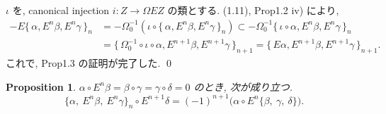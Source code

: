\documentclass[12pt, leqno]{ltjsarticle}
\newcommand{\Ex}{E}        %
\newcommand{\todai}[2][]{\{\,#2\,\}_{#1}}      %
\numberwithin{equation}{section}
\theoremstyle{plain}
\newtheorem{proposition}[theorem]{Proposition}
\theoremstyle{definition}
\theoremstyle{remark}
\begin{document}
\(\iota\) を, canonical injection \(i:Z\to \Omega EZ\)
の類とする.
(1.11), Prop1.2 iv) により,
\[
\begin{align*}
  -E\todai[n]{\alpha, E^n\beta, E^n\gamma}
  & = -\Omega_0^{-1}(\iota \circ \todai[n]{\alpha, E^n\beta, E^n\gamma})
  \subset -\Omega_0^{-1}\todai[n]{\iota\circ\alpha, E^n\beta, E^n\gamma}\\
  & = \todai[n+1]{\Omega_0^{-1}\circ\iota\circ\alpha, E^{n+1}\beta, E^{n+1}\gamma}
  = \todai[n+1]{E\alpha, E^{n+1}\beta, E^{n+1}\gamma}.
\end{align*}
\]
これで, Prop1.3 の証明が完了した.
\qed

\begin{proposition}\label{prop:1-4}
$\alpha\circ \Ex^n\beta=\beta\circ\gamma=\gamma\circ\delta=0$ のとき, 
次が成り立つ.
\[
\{\alpha,\ \Ex^n\beta,\ \Ex^n\gamma\}_n\circ\Ex^{n+1}\delta
=
(-1)^{n+1}\bigl(\alpha\circ \Ex^n\{\beta,\ \gamma,\ \delta\}\bigr).
\]
\end{proposition}
\end{document}
